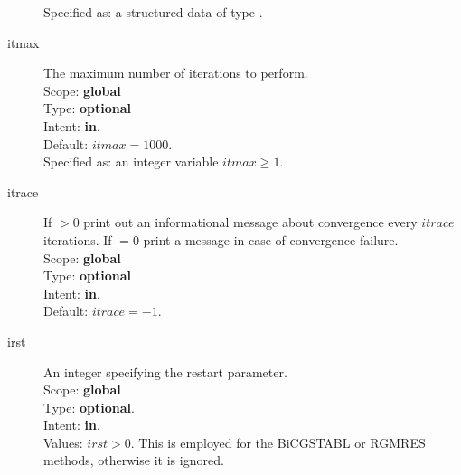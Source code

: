 \begin{description}
Specified as: a structured data of type \descdata.
\item[itmax]  The maximum number of iterations to perform.\\
Scope: {\bf global} \\
Type: {\bf optional}\\
Intent: {\bf in}.\\
Default: $itmax = 1000$.\\
Specified as: an integer variable $itmax \ge 1$.
\item[itrace] If $>0$  print out an informational message about
  convergence  every $itrace$ iterations. If $=0$ print a message in
  case of convergence failure.\\ 
Scope: {\bf global} \\
Type: {\bf optional}\\
Intent: {\bf in}.\\
Default: $itrace = -1$.\\
\item[irst]  An integer specifying the restart parameter.\\
Scope: {\bf global} \\
Type: {\bf optional}.\\
Intent: {\bf in}.\\
Values: $irst>0$. This is employed for the BiCGSTABL or RGMRES
methods, otherwise it is ignored. 


\end{description}
